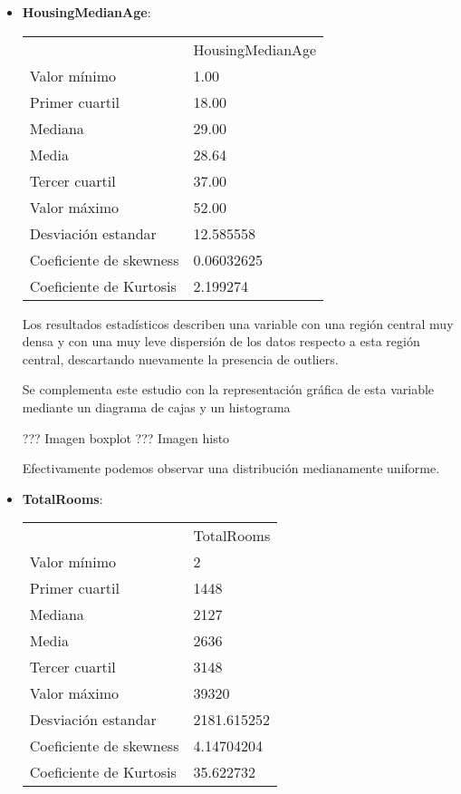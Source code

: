 {\begin{itemize}
??? Imagen boxplot
??? Imagen histo

Se confirma una distribución concentrada de los datos levemente desplazada a valores situados a la izquierda. 


	
	\item \textbf{HousingMedianAge}: 
	\begin{table}[]
		\begin{tabular}{ll}
			& HousingMedianAge \\
			Valor mínimo            & 1.00             \\
			Primer cuartil          & 18.00            \\
			Mediana                 & 29.00            \\
			Media                   & 28.64            \\
			Tercer cuartil          & 37.00            \\
			Valor máximo            & 52.00            \\ \hline
			Desviación estandar     & 12.585558        \\ \hline
			Coeficiente de skewness & 0.06032625       \\
			Coeficiente de Kurtosis & 2.199274        
		\end{tabular}
	\end{table}

Los resultados estadísticos describen una variable con una región central muy densa y con una muy leve dispersión de los datos respecto a esta región central, descartando nuevamente la presencia de outliers.

Se complementa este estudio con la representación gráfica de esta variable mediante un diagrama de cajas y un histograma

??? Imagen boxplot
??? Imagen histo

Efectivamente podemos observar una distribución medianamente uniforme.

	
	\item \textbf{TotalRooms}: 
	\begin{table}[]
		\begin{tabular}{ll}
			& TotalRooms  \\
			Valor mínimo            & 2           \\
			Primer cuartil          & 1448        \\
			Mediana                 & 2127        \\
			Media                   & 2636        \\
			Tercer cuartil          & 3148        \\
			Valor máximo            & 39320       \\ \hline
			Desviación estandar     & 2181.615252 \\ \hline
			Coeficiente de skewness & 4.14704204  \\
			Coeficiente de Kurtosis & 35.622732  
		\end{tabular}
	\end{table}



\end{itemize}}
